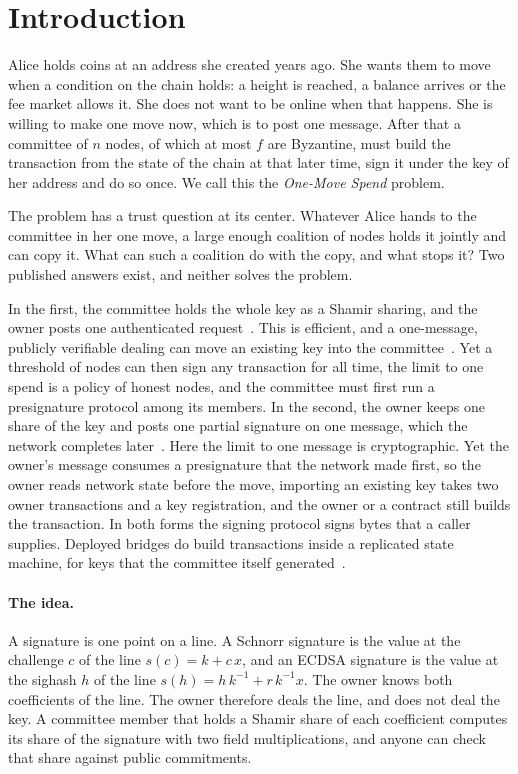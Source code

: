 \section{Introduction}\label{sec:intro}

Alice holds coins at an address she created years ago. She wants them to move when a condition on the chain holds: a height is reached, a balance arrives or the fee market allows it. She does not want to be online when that happens. She is willing to make one move now, which is to post one message. After that a committee of $n$ nodes, of which at most $f$ are Byzantine, must build the transaction from the state of the chain at that later time, sign it under the key of her address and do so once. We call this the \emph{One-Move Spend} problem.

The problem has a trust question at its center. Whatever Alice hands to the committee in her one move, a large enough coalition of nodes holds it jointly and can copy it. What can such a coalition do with the copy, and what stops it? Two published answers exist, and neither solves the problem.

In the first, the committee holds the whole key as a Shamir sharing, and the owner posts one authenticated request~\cite{GS22,TroutPP,HOT}. This is efficient, and a one-message, publicly verifiable dealing can move an existing key into the committee~\cite{cgVSS,Groth21}. Yet a threshold of nodes can then sign any transaction for all time, the limit to one spend is a policy of honest nodes, and the committee must first run a presignature protocol among its members. In the second, the owner keeps one share of the key and posts one partial signature on one message, which the network completes later~\cite{FMMSS25,IkaDocs}. Here the limit to one message is cryptographic. Yet the owner's message consumes a presignature that the network made first, so the owner reads network state before the move, importing an existing key takes two owner transactions and a key registration, and the owner or a contract still builds the transaction. In both forms the signing protocol signs bytes that a caller supplies. Deployed bridges do build transactions inside a replicated state machine, for keys that the committee itself generated~\cite{ckETH,ckBTC,THORChain}.

\paragraph{The idea.} A signature is one point on a line. A Schnorr signature is the value at the challenge $c$ of the line $s(c) = k + c\,x$, and an ECDSA signature is the value at the sighash $h$ of the line $s(h) = h\,k^{-1} + r\,k^{-1}x$. The owner knows both coefficients of the line. The owner therefore deals the line, and does not deal the key. A committee member that holds a Shamir share of each coefficient computes its share of the signature with two field multiplications, and anyone can check that share against public commitments.

